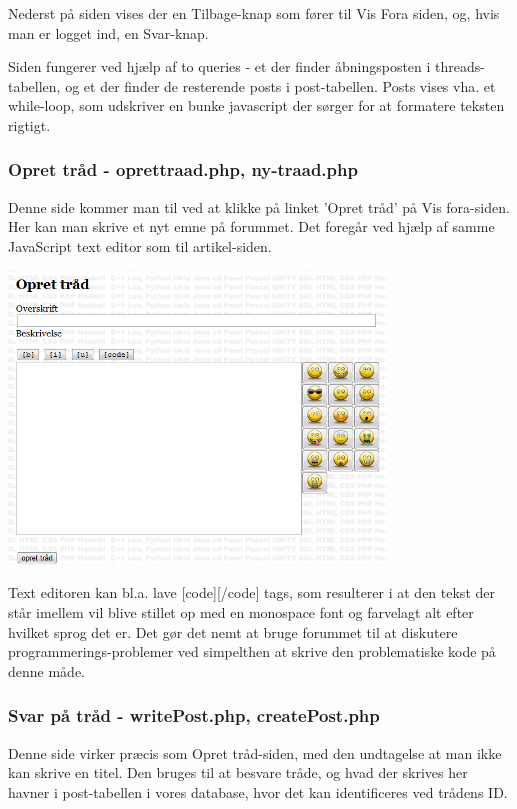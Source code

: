 \documentclass{article}
\begin{document}
Nederst på siden vises der en Tilbage-knap som fører til Vis Fora siden, og, hvis man er logget ind, en Svar-knap.

Siden fungerer ved hjælp af to queries - et der finder åbningsposten i threads-tabellen, og et der finder de resterende posts i post-tabellen. Posts vises vha. et while-loop, som udskriver en bunke javascript der sørger for at formatere teksten rigtigt.

\subsubsection[Opret tråd]{Opret tråd - oprettraad.php, ny-traad.php}

Denne side kommer man til ved at klikke på linket 'Opret tråd' på Vis fora-siden. Her kan man skrive et nyt emne på forummet. Det foregår ved hjælp af samme JavaScript text editor som til artikel-siden.

\includegraphics[width=100mm]{mi17.png}

Text editoren kan bl.a. lave [code][/code] tags, som resulterer i at den tekst der står imellem vil blive stillet op med en monospace font og farvelagt alt efter hvilket sprog det er. Det gør det nemt at bruge forummet til at diskutere programmerings-problemer ved simpelthen at skrive den problematiske kode på denne måde.

\subsubsection[Svar på tråd]{Svar på tråd - writePost.php, createPost.php}

Denne side virker præcis som Opret tråd-siden, med den undtagelse at man ikke kan skrive en titel. Den bruges til at besvare tråde, og hvad der skrives her havner i post-tabellen i vores database, hvor det kan identificeres ved trådens ID.
\end{document}
